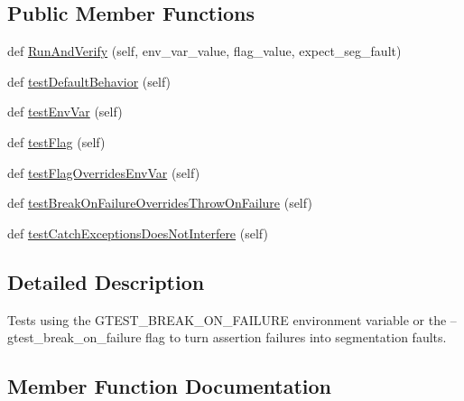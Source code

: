 \subsection*{Public Member Functions}
\begin{DoxyCompactItemize}
\item 
def \hyperlink{classgtest__break__on__failure__unittest_1_1GTestBreakOnFailureUnitTest_a0a66475873f545d88655b8bb14368f2e}{Run\+And\+Verify} (self, env\+\_\+var\+\_\+value, flag\+\_\+value, expect\+\_\+seg\+\_\+fault)
\item 
def \hyperlink{classgtest__break__on__failure__unittest_1_1GTestBreakOnFailureUnitTest_a8c21b7ecccc27268cb6c3d30b933b812}{test\+Default\+Behavior} (self)
\item 
def \hyperlink{classgtest__break__on__failure__unittest_1_1GTestBreakOnFailureUnitTest_a2beae948940a4fd898c8183c3bb221da}{test\+Env\+Var} (self)
\item 
def \hyperlink{classgtest__break__on__failure__unittest_1_1GTestBreakOnFailureUnitTest_af6018e5253c1107c5afaba3e2cb573fe}{test\+Flag} (self)
\item 
def \hyperlink{classgtest__break__on__failure__unittest_1_1GTestBreakOnFailureUnitTest_a15836ddb27e51e9aaf2f8aad84f5cef7}{test\+Flag\+Overrides\+Env\+Var} (self)
\item 
def \hyperlink{classgtest__break__on__failure__unittest_1_1GTestBreakOnFailureUnitTest_a3c5855e045236a309a5bff73ee6b503e}{test\+Break\+On\+Failure\+Overrides\+Throw\+On\+Failure} (self)
\item 
def \hyperlink{classgtest__break__on__failure__unittest_1_1GTestBreakOnFailureUnitTest_a70cc7732ac68ffe587657a3a5309aa4a}{test\+Catch\+Exceptions\+Does\+Not\+Interfere} (self)
\end{DoxyCompactItemize}


\subsection{Detailed Description}
\begin{DoxyVerb}Tests using the GTEST_BREAK_ON_FAILURE environment variable or
the --gtest_break_on_failure flag to turn assertion failures into
segmentation faults.
\end{DoxyVerb}
 

\subsection{Member Function Documentation}
